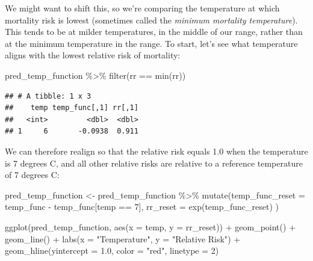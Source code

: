 \documentclass[
]{book}
\newenvironment{Shaded}{\begin{snugshade}}{\end{snugshade}}
\newcommand{\AttributeTok}[1]{\textcolor[rgb]{0.77,0.63,0.00}{#1}}
\newcommand{\DecValTok}[1]{\textcolor[rgb]{0.00,0.00,0.81}{#1}}
\newcommand{\FloatTok}[1]{\textcolor[rgb]{0.00,0.00,0.81}{#1}}
\newcommand{\FunctionTok}[1]{\textcolor[rgb]{0.00,0.00,0.00}{#1}}
\newcommand{\NormalTok}[1]{#1}
\newcommand{\OtherTok}[1]{\textcolor[rgb]{0.56,0.35,0.01}{#1}}
\newcommand{\SpecialCharTok}[1]{\textcolor[rgb]{0.00,0.00,0.00}{#1}}
\newcommand{\StringTok}[1]{\textcolor[rgb]{0.31,0.60,0.02}{#1}}
\begin{document}
We might want to shift this, so we're comparing the temperature at which mortality risk
is lowest (sometimes called the \emph{minimum mortality temperature}). This tends to be at
milder temperatures, in the middle of our range, rather than at the minimum temperature in
the range. To start, let's see what temperature aligns with the lowest relative risk of
mortality:

\begin{Shaded}
\begin{Highlighting}[]
\NormalTok{pred\_temp\_function }\SpecialCharTok{\%\textgreater{}\%} 
  \FunctionTok{filter}\NormalTok{(rr }\SpecialCharTok{==} \FunctionTok{min}\NormalTok{(rr))}
\end{Highlighting}
\end{Shaded}

\begin{verbatim}
## # A tibble: 1 x 3
##    temp temp_func[,1] rr[,1]
##   <int>         <dbl>  <dbl>
## 1     6       -0.0938  0.911
\end{verbatim}

We can therefore realign so that the relative risk equals 1.0 when the temperature is 7 degrees
C, and all other relative risks are relative to a reference temperature of 7 degrees C:

\begin{Shaded}
\begin{Highlighting}[]
\NormalTok{pred\_temp\_function }\OtherTok{\textless{}{-}}\NormalTok{ pred\_temp\_function }\SpecialCharTok{\%\textgreater{}\%} 
  \FunctionTok{mutate}\NormalTok{(}\AttributeTok{temp\_func\_reset =}\NormalTok{ temp\_func }\SpecialCharTok{{-}}\NormalTok{ temp\_func[temp }\SpecialCharTok{==} \DecValTok{7}\NormalTok{],}
         \AttributeTok{rr\_reset =} \FunctionTok{exp}\NormalTok{(temp\_func\_reset)}
\NormalTok{)}

\FunctionTok{ggplot}\NormalTok{(pred\_temp\_function, }\FunctionTok{aes}\NormalTok{(}\AttributeTok{x =}\NormalTok{ temp, }\AttributeTok{y =}\NormalTok{ rr\_reset)) }\SpecialCharTok{+} 
  \FunctionTok{geom\_point}\NormalTok{() }\SpecialCharTok{+} 
  \FunctionTok{geom\_line}\NormalTok{() }\SpecialCharTok{+} 
  \FunctionTok{labs}\NormalTok{(}\AttributeTok{x =} \StringTok{"Temperature"}\NormalTok{, }
       \AttributeTok{y =} \StringTok{"Relative Risk"}\NormalTok{) }\SpecialCharTok{+} 
  \FunctionTok{geom\_hline}\NormalTok{(}\AttributeTok{yintercept =} \FloatTok{1.0}\NormalTok{, }\AttributeTok{color =} \StringTok{"red"}\NormalTok{, }\AttributeTok{linetype =} \DecValTok{2}\NormalTok{)}
\end{Highlighting}
\end{Shaded}
\end{document}
